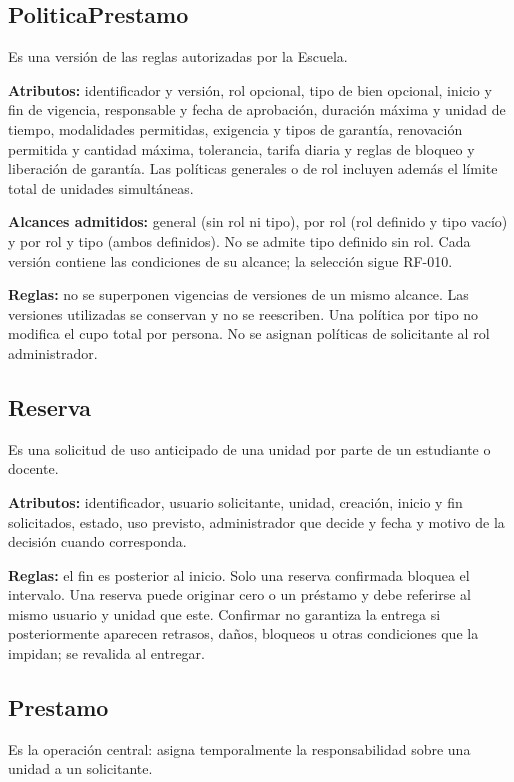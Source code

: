 \subsection{PoliticaPrestamo}
Es una versi\'on de las reglas autorizadas por la Escuela.

\textbf{Atributos:} identificador y versi\'on, rol opcional, tipo de bien opcional, inicio y fin de vigencia, responsable y fecha de aprobaci\'on, duraci\'on m\'axima y unidad de tiempo, modalidades permitidas, exigencia y tipos de garant\'ia, renovaci\'on permitida y cantidad m\'axima, tolerancia, tarifa diaria y reglas de bloqueo y liberaci\'on de garant\'ia. Las pol\'iticas generales o de rol incluyen adem\'as el l\'imite total de unidades simult\'aneas.

\textbf{Alcances admitidos:} general (sin rol ni tipo), por rol (rol definido y tipo vac\'io) y por rol y tipo (ambos definidos). No se admite tipo definido sin rol. Cada versi\'on contiene las condiciones de su alcance; la selecci\'on sigue RF-010.

\textbf{Reglas:} no se superponen vigencias de versiones de un mismo alcance. Las versiones utilizadas se conservan y no se reescriben. Una pol\'itica por tipo no modifica el cupo total por persona. No se asignan pol\'iticas de solicitante al rol administrador.

\subsection{Reserva}
Es una solicitud de uso anticipado de una unidad por parte de un estudiante o docente.

\textbf{Atributos:} identificador, usuario solicitante, unidad, creaci\'on, inicio y fin solicitados, estado, uso previsto, administrador que decide y fecha y motivo de la decisi\'on cuando corresponda.

\textbf{Reglas:} el fin es posterior al inicio. Solo una reserva confirmada bloquea el intervalo. Una reserva puede originar cero o un pr\'estamo y debe referirse al mismo usuario y unidad que este. Confirmar no garantiza la entrega si posteriormente aparecen retrasos, da\~nos, bloqueos u otras condiciones que la impidan; se revalida al entregar.

\subsection{Prestamo}
Es la operaci\'on central: asigna temporalmente la responsabilidad sobre una unidad a un solicitante.

